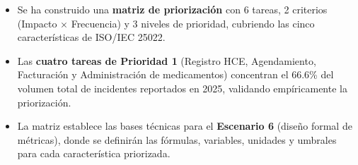 \documentclass[12pt,a4paper]{article}
\begin{document}
\begin{tcolorbox}[colback=green!5, colframe=green!50!black, title=Resultado obtenido]
\begin{itemize}
    \item Se ha construido una \textbf{matriz de priorizaci\'on} con 6 tareas, 2 criterios (Impacto $\times$ Frecuencia) y 3 niveles de prioridad, cubriendo las cinco caracter\'isticas de ISO/IEC 25022.
    \item Las \textbf{cuatro tareas de Prioridad 1} (Registro HCE, Agendamiento, Facturaci\'on y Administraci\'on de medicamentos) concentran el 66.6\% del volumen total de incidentes reportados en 2025, validando emp\'iricamente la priorizaci\'on.
    \item La matriz establece las bases t\'ecnicas para el \textbf{Escenario 6} (dise\~no formal de m\'etricas), donde se definir\'an las f\'ormulas, variables, unidades y umbrales para cada caracter\'istica priorizada.
\end{itemize}
\end{tcolorbox}
\end{document}
